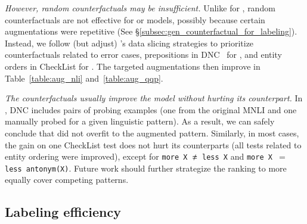 \TableAugQQP


\emph{However, random counterfactuals may be insufficient.}
Unlike for \sst, random counterfactuals are not effective for \nli or \qqp models, possibly because certain augmentations were repetitive (See \S\ref{subsec:gen_counterfactual_for_labeling}).
Instead, we follow (but adjust) \citet{chen2019slice}'s data slicing strategies to prioritize counterfactuals related to error cases, \eg prepositions in DNC~\cite{kim2019probing} for \nli, and entity orders in CheckList for \qqp.
The targeted augmentations then improve \maug in Table~\ref{table:aug_nli} and~\ref{table:aug_qqp}.

\emph{The counterfactuals usually improve the model without hurting its counterpart.}
In \nli, DNC includes pairs of probing examples (one from the original MNLI and one manually probed for a given linguistic pattern).
As a result, we can safely conclude that \nli did not overfit to the augmented pattern.
Similarly, in most \qqp cases, the gain on one CheckList test does not hurt its counterparts (\eg all tests related to entity ordering were improved), except for \texttt{more X $\not\eq$ less X} and \texttt{more X $=$ less antonym(X)}.
Future work should further strategize the ranking to more equally cover competing patterns. 




\subsection{Labeling efficiency}
\label{subsec:label_procedure}




